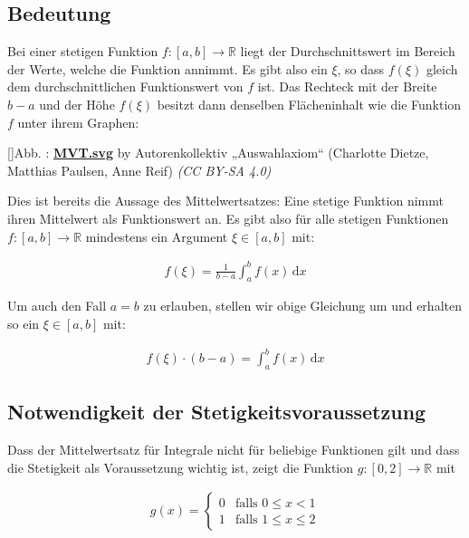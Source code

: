 \documentclass[fontsize=9pt,
               parskip=half-,
               DIV=14,
               listof=chapterentry,
               tocflat]{scrbook}
\newcounter{imagelabel}
\begin{document}
\subsection{Bedeutung}

Bei einer stetigen Funktion $f:[a,b]\to \mathbb {R} $ liegt der Durchschnittswert im Bereich der Werte, welche die Funktion annimmt. Es gibt also ein $\xi $, so dass $f(\xi )$ gleich dem durchschnittlichen Funktionswert von $f$ ist. Das Rechteck mit der Breite $b-a$ und der Höhe $f(\xi )$ besitzt dann denselben Flächeninhalt wie die Funktion $f$ unter ihrem Graphen:

[]{Abb. : \protect\href{https://commons.wikimedia.org/wiki/File:MVT.svg}{\textbf{MVT.svg}} by Autorenkollektiv „Auswahlaxiom“ (Charlotte Dietze, Matthias Paulsen, Anne Reif) \textit{(CC BY-SA 4.0)}}\begin{center}
\end{center}

Dies ist bereits die Aussage des Mittelwertsatzes: Eine stetige Funktion nimmt ihren Mittelwert als Funktionswert an. Es gibt also für alle stetigen Funktionen $f:[a,b]\to \mathbb {R} $ mindestens ein Argument $\xi \in [a,b]$ mit:

\begin{align*}
f(\xi )={\frac {1}{b-a}}\int _{a}^{b}f(x)\,\mathrm {d} x
\end{align*}

Um auch den Fall $a=b$ zu erlauben, stellen wir obige Gleichung um und erhalten so ein $\xi \in [a,b]$ mit:

\begin{align*}
f(\xi )\cdot (b-a)=\int _{a}^{b}f(x)\,\mathrm {d} x
\end{align*}

\subsection{Notwendigkeit der Stetigkeitsvoraussetzung}

Dass der Mittelwertsatz für Integrale nicht für beliebige Funktionen gilt und dass die Stetigkeit als Voraussetzung wichtig ist, zeigt die Funktion $g:[0,2]\to \mathbb {R} $ mit

\begin{align*}
g(x)={\begin{cases}0&{\text{falls }}0\leq x<1\\1&{\text{falls }}1\leq x\leq 2\end{cases}}
\end{align*}
\end{document}
